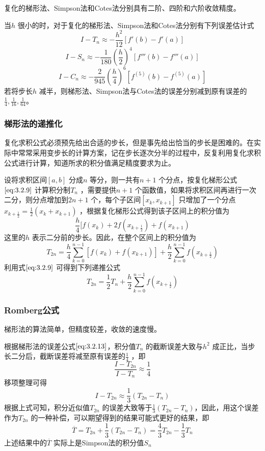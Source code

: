 \documentclass[a4paper]{article}
\begin{document}
复化的梯形法、Simpson法和Cotes法分别具有二阶、四阶和六阶收敛精度。

当$h$ 很小的时，对于复化的梯形法、Simpson法和Cotes法分别有下列误差估计式
\[
	I - T_n \approx - \frac{h^2}{12} [f'(b) - f'(a)] \tag{3.2.13} \label{eq:3.2.13}
\] 
\[
	I - S_n \approx - \frac{1}{180} (\frac{h}{2})^{4} [f'''(b) - f'''(a)] \tag{3.2.14} \label{eq:3.2.14}
\] 
\[
	I - C_n \approx -\frac{2}{945} (\frac{h}{4})^{6} [f^{(5)}(b) - f^{(5)}(a)] \tag{3.2.15} \label{eq:3.2.15}
\] 
若将步长$h$ 减半，则梯形法、Simpson法与Cotes法的误差分别减到原有误差的$\frac{1}{4}, \frac{1}{16}, \frac{1}{64}$。

\subsubsection{梯形法的递推化}
复化求积公式必须预先给出合适的步长，但是事先给出恰当的步长是困难的。在实际中常常采用变步长的计算方案，记在步长逐次分半的过程中，反复利用复化求积公式进行计算，知道所求的积分值满足精度要求为止。

设将求积区间$[a,b]$ 分成$n$ 等分，则一共有$n+1$ 个分点，按复化梯形公式$\ref{eq:3.2.9}$ 计算积分制$T_n$ ，需要提供$n+1$ 个函数值，如果将求积区间再进行一次二分，则分点增加到$2n+1$ 个，每个子区间$[x_{k},x_{k+1}]$ 只增加了一个分点$x_{k+\frac{1}{2}} = \frac{1}{2}(x_{k} + x_{k+1})$ ，根据复化梯形公式得到该子区间上的积分值为
\[
\frac{h}{4} [ f(x_{k}) + 2 f(x_{k+\frac{1}{2}}) + f(x_{k+1})
\] 
这里的$h$ 表示二分前的步长。因此，在整个区间上的积分值为
\[
	T_{2n} = \frac{h}{4} \sum_{k=0}^{n-1} [ f(x_{k}) + f(x_{k+1})] + \frac{h}{2} \sum_{k=0}^{n-1} f(x_{k+\frac{1}{2}})
\] 
利用式$\ref{eq:3.2.9}$ 可得到下列递推公式
\[
	T_{2n} = \frac{1}{2} T_n + \frac{h}{2} \sum_{k=0}^{n-1} f(x_{k+\frac{1}{2}}) \tag{3.3.1} \label{eq:3.3.1}
\] 

\subsubsection{Romberg公式}
梯形法的算法简单，但精度较差，收敛的速度慢。

根据梯形法的误差公式$\ref{eq:3.2.13}$，积分值$T_n$ 的截断误差大致与$h^2$ 成正比，当步长二分后，截断误差将减至原有误差的$\frac{1}{4}$ ，即
\[
	\frac{I - T_{2n}}{I - T_n} \approx \frac{1}{4}
\] 
移项整理可得
\[
	I - T_{2n} \approx \frac{1}{3} (T_{2n} - T_n) \tag{3.3.2} \label{eq:3.3.2}	
\] 
根据上式可知，积分近似值$T_{2n}$ 的误差大致等于$\frac{1}{3}(T_{2n} - T_n)$，因此，用这个误差作为$T_{2n}$ 的一种补偿，可以期望得到的结果可能式更好的结果，即
\[
	\overline{T} = T_{2n} + \frac{1}{3} (T_{2n} - T_n) = \frac{4}{3} T_{2n} - \frac{1}{3} T_n \tag{3.3.3} \label{eq:3.3.3}
\] 
上述结果中的$\overline{T}$ 实际上是Simpson法的积分值$S_n$ 
\end{document}
